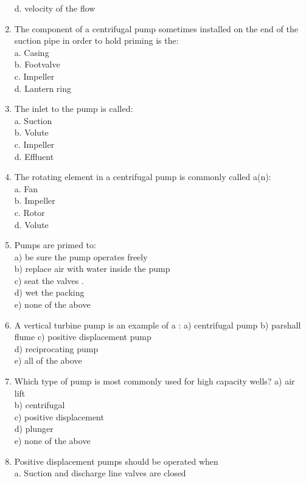 \begin{enumerate}[1.]
d. velocity of the flow\\
\item The component of a centrifugal pump sometimes installed on the end of the suction pipe in order to hold priming is the:\\
a. Casing\\
b. Footvalve\\
c. Impeller\\
d. Lantern ring\\
\item The inlet to the pump is called:\\
a. Suction\\
b. Volute\\
c. Impeller\\
d. Effluent\\
\item The rotating element in a centrifugal pump is commonly called a(n):\\
a. Fan\\
b. Impeller\\
c. Rotor\\
d. Volute\\
\item Pumps are primed to:\\
a) be sure the pump operates freely\\
b) replace air with water inside the pump\\
c) seat the valves .\\
d) wet the packing\\
e) none of the above\\
\item A vertical turbine pump is an example of a : a) centrifugal pump b) parshall flume c) positive displacement pump\\
d) reciprocating pump\\
e) all of the above\\
\item Which type of pump is most commonly used for high capacity wells? a) air lift\\
b) centrifugal\\
c) positive displacement\\
d) plunger\\
e) none of the above\\
\item Positive displacement pumps should be operated when\\
a. Suction and discharge line valves are closed\\

\end{enumerate}
